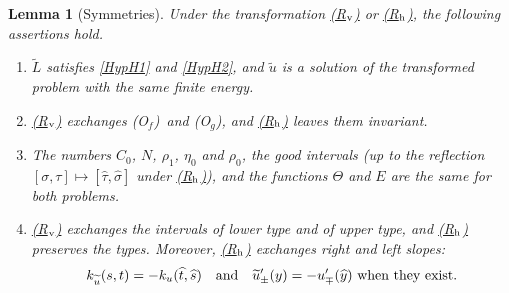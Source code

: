 \documentclass[reqno,12pt]{amsart}
\numberwithin{equation}{section}
\def\Of{{\sf (O$_f$)}}
\newcommand{\Rv}{\hyperref[HypS1]{{\sf (R$_{\rm v}$)}}}
\newcommand{\Rh}{\hyperref[HypS2]{{\sf (R$_{\rm h}$)}}}
\def\Og{{\sf (O$_g$)}}
\newtheorem{lemma}[theorem]{Lemma}
\theoremstyle{remark}
\begin{document}
\begin{lemma}[Symmetries]\label{L-sym}
Under the transformation \Rv{} or \Rh{}, the following assertions hold.
\begin{enumerate}[leftmargin=3em, itemsep=0.5em, topsep=0.5em]
\item[{\rm(i)}] $\widetilde L$ satisfies \ref{HypH1} and \ref{HypH2}, and $\widetilde u$ is a solution of the transformed problem with the same finite energy.
\item[{\rm(ii)}] \Rv{} exchanges \Of\ and \Og, and \Rh{} leaves them invariant.
\item[{\rm(iii)}] The numbers $C_0$, $N$, $\rho_1$, $\eta_0$ and $\rho_0$, the good intervals {\rm(}up to the reflection $[\sigma,\tau]\mapsto[\widehat\tau,\widehat\sigma]$ under \Rh{}{\rm)}, and the functions $\Theta$ and $E$ are the same for both problems.
\item[{\rm(iv)}] \Rv{} exchanges the intervals of lower type and of upper type, and \Rh{} preserves the types. Moreover, \Rh{} exchanges right and left slopes{\rm:}
\begin{equation*}
k_{\widetilde u}(s,t)=-k_u(\widehat t,\widehat s)\quad\hbox{and}\quad\widetilde u^\prime_\pm(y)=-u^\prime_\mp(\widehat y)\hbox{ when they exist.}
\end{equation*}
\end{enumerate}
\end{lemma}
\end{document}
